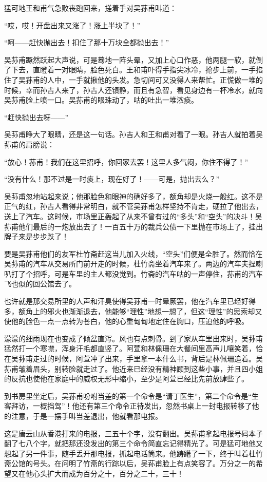 \par 猛可地王和甫气急败丧跑回来，搓着手对吴荪甫叫道：
\par “哎，哎！开盘出来又涨了！涨上半块了！”
\par “呵——赶快抛出去！扣住了那十万块全都抛出去！”
\par 吴荪甫蹶然跃起大声说，可是蓦地一阵头晕，又加上心口作恶，他两腿一软，就倒了下去，直瞪着一对眼睛，脸色死白。王和甫吓得手指尖冰冷，抢步上前，一手掐住了吴荪甫的人中，一手就揪他的头发。急切间可又没得人来帮忙。正慌做一堆的时候，幸而孙吉人来了，孙吉人还镇静，而且有急智，看见身边有一杯冷水，就向吴荪甫脸上喷一口。吴荪甫的眼珠动了，咕的吐出一堆浓痰。
\par “赶快抛出去呀——”
\par 吴荪甫睁大了眼睛，还是这一句话。孙吉人和王和甫对看了一眼。孙吉人就拍着吴荪甫的肩膀说：
\par “放心！荪甫！我们在这里招呼，你回家去罢！这里人多气闷，你住不得了！”
\par “没有什么！那不过是一时痰上，现在好了！——可是，抛出去么？”
\par 吴荪甫忽地站起来说；他那脸色和眼神的确好多了，额角却是火烧一般红。这不是正气的红，孙吉人看得非常明白，就不管吴荪甫怎样坚持不肯走，硬拉了他出去，送上了汽车。这时候，市场里正轰起了从来不曾有过的“多头”和“空头”的决斗！吴荪甫他们最后的一炮放出去了！一百五十万的裁兵公债一下里抛在市场上了，挂出牌子来是步步跌了！
\par 要是吴荪甫他们的友军杜竹斋赶这当儿加入火线，“空头”们便是全胜了。然而恰在吴荪甫的汽车从交易所门前开走的时候，杜竹斋坐着汽车来了。两边的汽车夫捏喇叭打了个招呼，可是车里的主人都没觉到。竹斋的汽车咕的一声停住，荪甫的汽车飞也似的回公馆去了。
\par 也许就是那交易所里的人声和汗臭使得吴荪甫一时晕厥罢，他在汽车里已经好得多，额角上的邪火也渐渐退去，他能够“理性”地想一想了，但这“理性”的思索却又使他的脸色一点一点转为苍白，他的心重甸甸地定住在胸口，压迫他的呼吸。
\par 濛濛的细雨现在也变成了倾盆直泻。风也有点刺骨。到了家从车里出来时，吴荪甫猛然打一个寒噤，浑身汗毛都直竖了。阿萱和林佩珊在大餐间里高声儿嚷笑着，恰在吴荪甫走过的时候，阿萱冲了出来，手里拿一本什么书，背后是林佩珊追着。吴荪甫皱着眉头，别转脸就走过了。他近来已经没有精神顾到这些小事，并且四小姐的反抗也使他在家庭中的威权无形中缩小，至少是阿萱已经比先前放肆些了。
\par 到书房里坐定后，吴荪甫吩咐当差的第一个命令是“请丁医生”，第二个命令是“生客拜访，一概挡驾”！他还有第三个命令正待发出，忽然书桌上一封电报转移了他的注意，于是一摆手叫当差退出，他就看那电报。
\par 这是唐云山从香港打来的电报，三五十个字，没有翻出。吴荪甫拿起电报号码本子翻了七八个字，就把那还没发出的第三个命令简直忘记得精光了。可是猛可地他又想起了另一件事，随手丢开那电报，抓起电话筒来。他踌躇了一下，终于叫着杜竹斋公馆的号头。在问明了竹斋的行踪以后，吴荪甫脸上有点笑容了。万分之一的希望又在他心头扩大而成为百分之十，百分之二十，三十！
